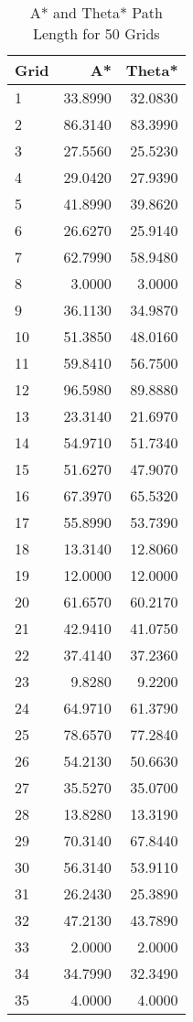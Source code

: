 \documentclass[12pt]{article}
\begin{document}
\begin{longtable}{|l|r|r|}
\caption{A* and Theta* Path Length for 50 Grids}
\label{table:pathLength} \\
\hline
Grid & A* & Theta* \\
\hline
1  &  33.8990 & 32.0830 \\
2  &  86.3140 & 83.3990 \\
3  &  27.5560 & 25.5230 \\
4  &  29.0420 & 27.9390 \\
5  &  41.8990 & 39.8620 \\
6  &  26.6270 & 25.9140 \\
7  &  62.7990 & 58.9480 \\
8  &   3.0000 &  3.0000 \\
9  &  36.1130 & 34.9870 \\
10 &  51.3850 & 48.0160 \\
11 &  59.8410 & 56.7500 \\
12 &  96.5980 & 89.8880 \\
13 &  23.3140 & 21.6970 \\
14 &  54.9710 & 51.7340 \\
15 &  51.6270 & 47.9070 \\
16 &  67.3970 & 65.5320 \\
17 &  55.8990 & 53.7390 \\
18 &  13.3140 & 12.8060 \\
19 &  12.0000 & 12.0000 \\
20 &  61.6570 & 60.2170 \\
21 &  42.9410 & 41.0750 \\
22 &  37.4140 & 37.2360 \\
23 &   9.8280 &  9.2200 \\
24 &  64.9710 & 61.3790 \\
25 &  78.6570 & 77.2840 \\
26 &  54.2130 & 50.6630 \\
27 &  35.5270 & 35.0700 \\
28 &  13.8280 & 13.3190 \\
29 &  70.3140 & 67.8440 \\
30 &  56.3140 & 53.9110 \\
31 &  26.2430 & 25.3890 \\
32 &  47.2130 & 43.7890 \\
33 &   2.0000 &  2.0000 \\
34 &  34.7990 & 32.3490 \\
35 &   4.0000 &  4.0000 \\

\end{longtable}
\end{document}
